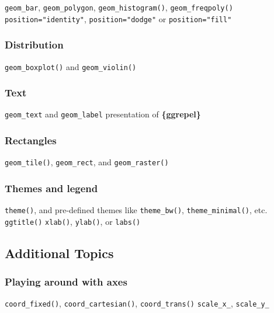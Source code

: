 \documentclass[
]{book}
\begin{document}
\texttt{geom\_bar}, \texttt{geom\_polygon}, \texttt{geom\_histogram()}, \texttt{geom\_freqpoly()}
\texttt{position="identity"}, \texttt{position="dodge"} or \texttt{position="fill"}

\hypertarget{distribution}{%
\subsubsection{Distribution}\label{distribution}}

\texttt{geom\_boxplot()} and \texttt{geom\_violin()}

\hypertarget{text}{%
\subsubsection{Text}\label{text}}

\texttt{geom\_text} and \texttt{geom\_label}
presentation of \textbf{\{ggrepel\}}

\hypertarget{rectangles}{%
\subsubsection{Rectangles}\label{rectangles}}

\texttt{geom\_tile()}, \texttt{geom\_rect}, and \texttt{geom\_raster()}

\hypertarget{themes-and-legend}{%
\subsubsection{Themes and legend}\label{themes-and-legend}}

\texttt{theme()}, and pre-defined themes like \texttt{theme\_bw()}, \texttt{theme\_minimal()}, etc.
\texttt{ggtitle()}
\texttt{xlab()}, \texttt{ylab()}, or \texttt{labs()}

\hypertarget{additional-topics}{%
\subsection{Additional Topics}\label{additional-topics}}

\hypertarget{playing-around-with-axes}{%
\subsubsection{Playing around with axes}\label{playing-around-with-axes}}

\texttt{coord\_fixed()}, \texttt{coord\_cartesian()}, \texttt{coord\_trans()}
\texttt{scale\_x\_}, \texttt{scale\_y\_}
\end{document}
